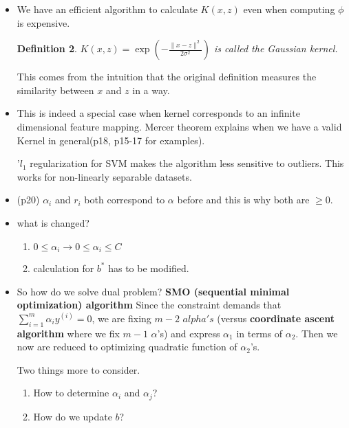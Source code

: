 \documentclass{article}
\newtheorem{definition}{Definition}
\theoremstyle{remark}
\begin{document}
\begin{itemize}
 \begin{definition}
Given a feature mapping $\phi$, we define the corresponding Kernel to be $$K(x,z)=\phi(x)^T \phi(z)$$.
 \end{definition}

 \item We have an efficient algorithm to calculate $K(x,z)$ even when computing $\phi$ is expensive.

 \begin{definition}
 $K(x,z)=\exp({-\frac{\lVert x-z\rVert ^2}{2\sigma^2}})$ is called the Gaussian kernel. 
 \end{definition}
 This comes from the intuition that the original definition measures the similarity between $x$ and $z$ in a way.

 \item This is indeed a special case when kernel corresponds to an infinite dimensional feature mapping. Mercer theorem explains when we have a valid Kernel in general(p18, p15-17 for examples).

 '$l_1$ regularization for SVM makes the algorithm less sensitive to outliers. This works for non-linearly separable datasets.

 \item (p20) $\alpha_i$ and $r_i$ both correspond to $\alpha$ before and this is why both are $\geq 0$.

\item what is changed?
\begin{enumerate}
\item $0\leq \alpha_i \to 0\leq \alpha_i \leq C$
\item calculation for $b^*$ has to be modified.

\end{enumerate}

 \item So how do we solve dual problem? \textbf{SMO (sequential minimal optimization) algorithm}
Since the constraint demands that $\sum_{i=1}^m \alpha_i y^{(i)}=0$, we are fixing $m-2$ $alpha's$ (versus \textbf{coordinate ascent algorithm} where we fix $m-1$ $\alpha$'s) and express $\alpha_1$ in terms of $\alpha_2$. Then we now are reduced to optimizing quadratic function of $\alpha_2$'s. 

Two things more to consider.
\begin{enumerate}
\item How to determine $\alpha_i$ and $\alpha_j$? 
\item How do we update $b$?
\end{enumerate}


\end{itemize}
\end{document}
